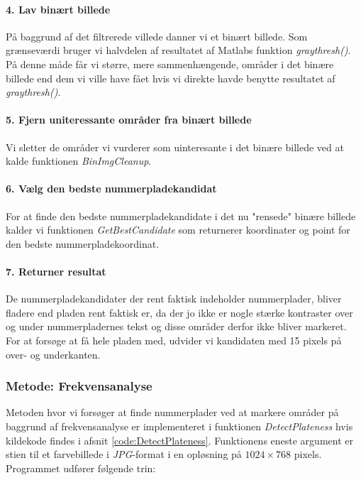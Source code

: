 \paragraph{4. Lav binært billede}
På baggrund af det filtrerede villede danner vi et binært billede. Som grænseværdi bruger vi halvdelen af resultatet af Matlabs funktion \textit{graythresh()}. På denne måde får vi større, mere sammenhængende, områder i det binære billede end dem vi ville have fået hvis vi direkte havde benytte resultatet af \textit{graythresh()}.

\paragraph{5. Fjern uniteressante områder fra binært billede}
Vi sletter de områder vi vurderer som uinteresante i det binære billede ved at kalde funktionen \textit{BinImgCleanup}.

\paragraph{6. Vælg den bedste nummerpladekandidat}
For at finde den bedste nummerpladekandidate i det nu "rensede" binære billede kalder vi funktionen \textit{GetBestCandidate} som returnerer koordinater og point for den bedste nummerpladekoordinat.

\paragraph{7. Returner resultat}
De nummerpladekandidater der rent faktisk indeholder nummerplader, bliver fladere end pladen rent faktisk er, da der jo ikke er nogle stærke kontraster over og under nummerpladernes tekst og disse områder derfor ikke bliver markeret. For at forsøge at få hele pladen med, udvider vi kandidaten med 15 pixels på over- og underkanten. 

\subsubsection{Metode: Frekvensanalyse}
Metoden hvor vi forsøger at finde nummerplader ved at markere områder på baggrund af frekvensanalyse er implementeret i funktionen \textit{DetectPlateness} hvis kildekode findes i afsnit \vref{code:DetectPlateness}. Funktionens eneste argument er stien til et farvebillede i \textit{JPG}-format i en opløsning på $1024 \times 768$ pixels. Programmet udfører følgende trin:

